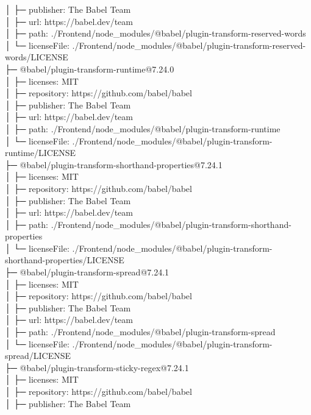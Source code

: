 │  ├─ publisher: The Babel Team\\
│  ├─ url: https://babel.dev/team\\
│  ├─ path: ./Frontend/node\_modules/@babel/plugin-transform-reserved-words\\
│  └─ licenseFile: ./Frontend/node\_modules/@babel/plugin-transform-reserved-words/LICENSE\\
├─ @babel/plugin-transform-runtime@7.24.0\\
│  ├─ licenses: MIT\\
│  ├─ repository: https://github.com/babel/babel\\
│  ├─ publisher: The Babel Team\\
│  ├─ url: https://babel.dev/team\\
│  ├─ path: ./Frontend/node\_modules/@babel/plugin-transform-runtime\\
│  └─ licenseFile: ./Frontend/node\_modules/@babel/plugin-transform-runtime/LICENSE\\
├─ @babel/plugin-transform-shorthand-properties@7.24.1\\
│  ├─ licenses: MIT\\
│  ├─ repository: https://github.com/babel/babel\\
│  ├─ publisher: The Babel Team\\
│  ├─ url: https://babel.dev/team\\
│  ├─ path: ./Frontend/node\_modules/@babel/plugin-transform-shorthand-properties\\
│  └─ licenseFile: ./Frontend/node\_modules/@babel/plugin-transform-shorthand-properties/LICENSE\\
├─ @babel/plugin-transform-spread@7.24.1\\
│  ├─ licenses: MIT\\
│  ├─ repository: https://github.com/babel/babel\\
│  ├─ publisher: The Babel Team\\
│  ├─ url: https://babel.dev/team\\
│  ├─ path: ./Frontend/node\_modules/@babel/plugin-transform-spread\\
│  └─ licenseFile: ./Frontend/node\_modules/@babel/plugin-transform-spread/LICENSE\\
├─ @babel/plugin-transform-sticky-regex@7.24.1\\
│  ├─ licenses: MIT\\
│  ├─ repository: https://github.com/babel/babel\\
│  ├─ publisher: The Babel Team\\
